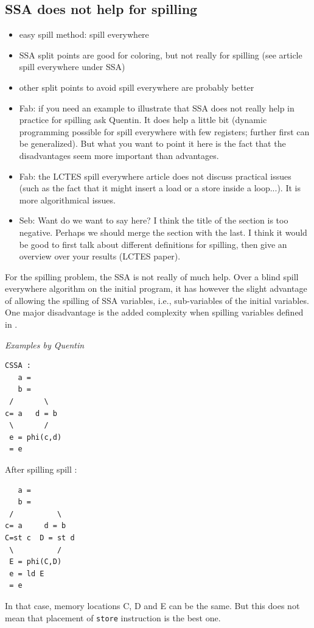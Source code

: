 {\subsection{SSA does not help for spilling}
{\sl
\begin{itemize}
  \item easy spill method: spill everywhere
  \item SSA split points are good for coloring, but not really for spilling 
    (see article spill everywhere under SSA)
  \item other split points to avoid spill everywhere are probably better
  \item Fab: if you need an example to illustrate that SSA does not really help 
    in practice for spilling ask Quentin. It does help a little bit (dynamic 
    programming possible for spill everywhere with few registers; further first 
    can be generalized). But what you want to point it here is the fact that 
    the disadvantages seem more important than advantages.
  \item Fab: the LCTES spill everywhere article does not discuss practical issues (such as the fact that it might insert a load or a store inside a loop...). It is more algorithmical issues.
  \item Seb: Want do we want to say here?
  	  I think the title of the section is too negative. 
  	  Perhaps we should merge the section with the last.
  	  I think it would be good to first talk about different definitions for spilling,
  	  then give an overview over your results (LCTES paper).
\end{itemize}
}

For the spilling problem, the SSA is not really of much help. Over a blind 
spill everywhere algorithm on the initial program, it has however the slight 
advantage of allowing the spilling of SSA variables, i.e., sub-variables of the 
initial variables. One major disadvantage is the added complexity when spilling
variables defined in \phifuns {}.

{\sl Examples by Quentin}
\begin{minipage}{.45\textwidth}
\begin{verbatim}
CSSA :
   a =
   b =
 /       \
c= a   d = b
 \       /
 e = phi(c,d)
 = e
\end{verbatim}
\end{minipage}
\begin{minipage}{.45\textwidth}
After spilling spill :
\begin{verbatim}
   a =
   b =
 /          \
c= a     d = b
C=st c  D = st d
 \          /
 E = phi(C,D)
 e = ld E
 = e
\end{verbatim}
\end{minipage}
In that case, memory locations C, D and E can be the same. But this does not 
mean that placement of {\tt store} instruction is the best one.

}
